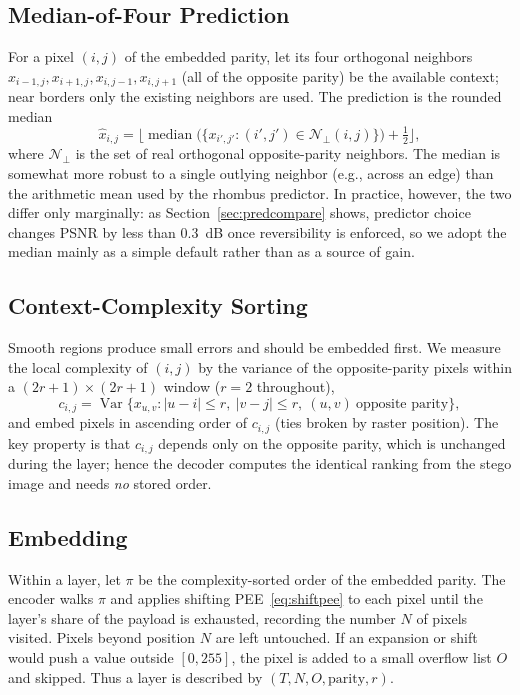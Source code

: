 \documentclass[journal,article,submit,pdftex,moreauthors]{Definitions/mdpi}
\begin{document}
\subsection{Median-of-Four Prediction}\label{sec:median}
For a pixel $(i,j)$ of the embedded parity, let its four orthogonal neighbors $x_{i-1,j},x_{i+1,j},x_{i,j-1},x_{i,j+1}$ (all of the opposite parity) be the available context; near borders only the existing neighbors are used. The prediction is the rounded median
\begin{equation}
\hat{x}_{i,j}=\Big\lfloor \operatorname{median}\big(\{x_{i',j'} : (i',j')\in\mathcal{N}_\perp(i,j)\}\big)+\tfrac{1}{2}\Big\rfloor,
\end{equation}
where $\mathcal{N}_\perp$ is the set of real orthogonal opposite-parity neighbors. The median is somewhat more robust to a single outlying neighbor (e.g., across an edge) than the arithmetic mean used by the rhombus predictor. In practice, however, the two differ only marginally: as Section~\ref{sec:predcompare} shows, predictor choice changes PSNR by less than $0.3$~dB once reversibility is enforced, so we adopt the median mainly as a simple default rather than as a source of gain.

\subsection{Context-Complexity Sorting}\label{sec:sorting}
Smooth regions produce small errors and should be embedded first. We measure the local complexity of $(i,j)$ by the variance of the opposite-parity pixels within a $(2r{+}1)\times(2r{+}1)$ window ($r=2$ throughout),
\begin{equation}
c_{i,j}=\operatorname{Var}\{x_{u,v} : |u-i|\le r,\ |v-j|\le r,\ (u,v)\ \text{opposite parity}\},
\end{equation}
and embed pixels in ascending order of $c_{i,j}$ (ties broken by raster position). The key property is that $c_{i,j}$ depends only on the opposite parity, which is unchanged during the layer; hence the decoder computes the identical ranking from the stego image and needs \emph{no} stored order.

\subsection{Embedding}\label{sec:embed}
Within a layer, let $\pi$ be the complexity-sorted order of the embedded parity. The encoder walks $\pi$ and applies shifting PEE~\eqref{eq:shiftpee} to each pixel until the layer's share of the payload is exhausted, recording the number $N$ of pixels visited. Pixels beyond position $N$ are left untouched. If an expansion or shift would push a value outside $[0,255]$, the pixel is added to a small overflow list $O$ and skipped. Thus a layer is described by $(T,N,O,\text{parity},r)$.
\end{document}
